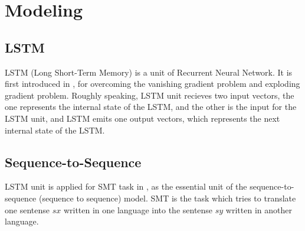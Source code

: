 \documentclass[senior,final,11pt]{iscs-thesis}
\newcommand{\argmax}{\mathop{\rm arg\,max}\limits}
\begin{document}


\section{Modeling}

\subsection{LSTM}
LSTM (Long Short-Term Memory) is a unit of Recurrent Neural Network. 
It is first introduced in \cite{first_LSTM}, for overcoming the vanishing gradient problem and exploding gradient problem.
Roughly speaking, LSTM unit recieves two input vectors, 
the one represents the internal state of the LSTM, and the other is the input for the LSTM unit, 
and LSTM emits one output vectors, which represents the next internal state of the LSTM.

\subsection{Sequence-to-Sequence}

LSTM unit is applied for SMT task in \cite{seq2seq}, as the essential unit of the sequence-to-sequence (sequence to sequence) model.
SMT is the task which tries to translate one sentense $sx$ written in one language into the sentense $sy$ written in another language.
\end{document}
